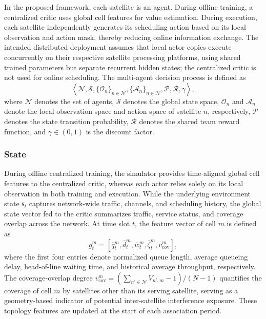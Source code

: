 \documentclass[journal]{IEEEtran}
\begin{document}
In the proposed framework, each satellite is an agent. During offline training, a centralized critic uses global cell features for value estimation. During execution, each satellite independently generates its scheduling action based on its local observation and action mask, thereby reducing online information exchange. The intended distributed deployment assumes that local actor copies execute concurrently on their respective satellite processing platforms, using shared trained parameters but separate recurrent hidden states; the centralized critic is not used for online scheduling. The multi-agent decision process is defined as
\begin{equation}
\left\langle
\mathcal{N},\mathcal{S},
\{\mathcal{O}_n\}_{n\in\mathcal{N}},
\{\mathcal{A}_n\}_{n\in\mathcal{N}},
\mathcal{P},\mathcal{R},\gamma
\right\rangle,
\end{equation}
where $\mathcal{N}$ denotes the set of agents, $\mathcal{S}$ denotes the global state space, $\mathcal{O}_n$ and $\mathcal{A}_n$ denote the local observation space and action space of satellite $n$, respectively, $\mathcal{P}$ denotes the state transition probability, $\mathcal{R}$ denotes the shared team reward function, and $\gamma\in(0,1)$ is the discount factor.

\subsubsection{State}

During offline centralized training, the simulator provides time-aligned global cell features to the centralized critic, whereas each actor relies solely on its local observation in both training and execution. While the underlying environment state $\mathsf{s}_t$ captures network-wide traffic, channels, and scheduling history, the global state vector fed to the critic summarizes traffic, service status, and coverage overlap across the network. At time slot $t$, the feature vector of cell $m$ is defined as
\begin{equation}
g_t^m=[\bar q_t^m,\bar d_t^m,\bar w_t^m,\bar\zeta_t^m,v_{\mathrm{cov}}^m],
\end{equation}
where the first four entries denote normalized queue length, average queueing delay, head-of-line waiting time, and historical average throughput, respectively. The coverage-overlap degree $v_{\mathrm{cov}}^m=(\sum_{n'\in\mathcal N}V_{n',m}-1)/(N-1)$ quantifies the coverage of cell $m$ by satellites other than its serving satellite, serving as a geometry-based indicator of potential inter-satellite interference exposure. These topology features are updated at the start of each association period.
\end{document}

